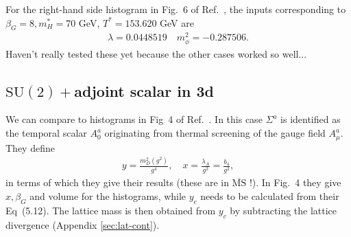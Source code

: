 \documentclass[11pt,a4paper]{article}
\newcommand\MSbar{$\overline{\text{MS}}$ } %
\newcommand\gr[1]{\mathrm{#1}}%
\newcommand\lauri[1]{{\color{myorange}#1}}
\begin{document}
For the right-hand side histogram in Fig.~6 of Ref.~\cite{Kajantie:1995kf}, the inputs corresponding to $\beta_G=8, m^*_H = 70$ GeV, $T^* = 153.620$ GeV are
\begin{align}
\label{eq:SM-inputs2}
\lambda = 0.0448519 \quad m^2_\phi = -0.287506.
\end{align}
\lauri{Haven't really tested these yet because the other cases worked so well...}


\subsection{$\gr{SU(2)} + $adjoint scalar in 3d}

We can compare to histograms in Fig~4 of Ref.~\cite{Kajantie:1997tt}. In this case $\Sigma^a$ is identified as the temporal scalar $A_0^a$ originating from thermal screening of the gauge field $A^a_\mu$. They define 
\begin{align}
	y = \frac{m^2_D(g^2)}{g^4}, \quad x = \frac{\lambda_A}{g^2} = \frac{b_4}{g^2},
\end{align}
in terms of which they give their results (these are in \MSbar!). In Fig.~4 they give $x, \beta_G$ and volume for the histograms, while $y_c$ needs to be calculated from their Eq~(5.12). The lattice mass is then obtained from $y_c$ by subtracting the lattice divergence (Appendix \ref{sec:lat-cont}).
\end{document}

